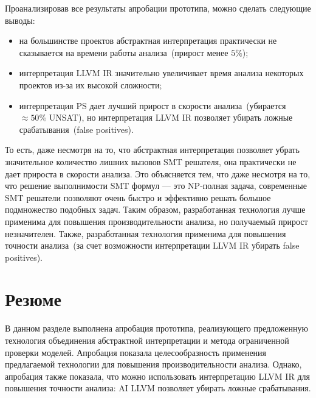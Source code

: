 Проанализировав все результаты апробации прототипа, можно сделать следующие 
выводы:
\begin{itemize}
\item на большинстве проектов абстрактная интерпретация практически не 
сказывается на времени работы анализа~(прирост менее $5\%$);
\item интерпретация LLVM IR значительно увеличивает время анализа некоторых
проектов из-за их высокой сложности;
\item интерпретация PS дает лучший прирост в скорости анализа~(убирается 
$\approx 50\%$ UNSAT), но интерпретация LLVM IR позволяет убирать ложные 
срабатывания~(false positives).
\end{itemize}

То есть, даже несмотря на то, что абстрактная интерпретация позволяет убрать
значительное количество лишних вызовов SMT решателя, она практически не
дает прироста в скорости анализа. Это объясняется тем, что даже несмотря на то, 
что решение выполнимости SMT формул --- это NP-полная задача, современные 
SMT решатели позволяют очень быстро и эффективно решать большое подмножество
подобных задач. Таким образом, разработанная технология лучше применима для
повышения производительности анализа, но получаемый прирост незначителен.
Также, разработанная технология применима для повышения точности анализа~(за 
счет возможности интерпретации LLVM IR убирать false positives).

\section{Резюме}
В данном разделе выполнена апробация прототипа, реализующего предложенную
технология объединения абстрактной интерпретации и метода ограниченной проверки
моделей. Апробация показала целесообразность применения предлагаемой 
технологии для повышения производительности анализа. Однако, апробация
также показала, что можно использовать интерпретацию LLVM IR для повышения
точности анализа: AI LLVM позволяет убирать ложные срабатывания.